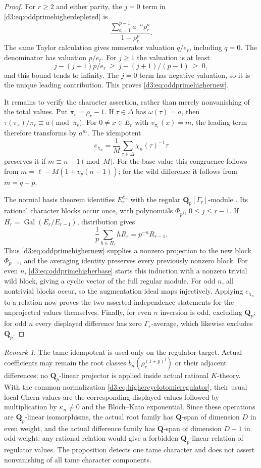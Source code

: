 \documentclass[11pt,a4paper]{amsart}
\numberwithin{equation}{section}
\theoremstyle{definition}
\theoremstyle{remark}
\newtheorem{remark}[theorem]{Remark}
\newcommand{\Q}{\mathbf Q}
\newcommand{\Gal}{\operatorname{Gal}}
\begin{document}
\begin{proof}
For $r\geq2$ and either parity, the $j=0$ term in
\eqref{d3:eq:oddprimehigherdepleted} is
\[
 \frac{\sum_{a=1}^{p-1}a^{-n}\rho_r^a}{1-\rho_r^p}.
\]
The same Taylor calculation gives numerator valuation $q/e_r$,
including $q=0$. The denominator has valuation $p/e_r$.
For $j\geq1$ the valuation is at least
\[
 j-(j+1)p/e_r\ \geq\ j-(j+1)/(p-1)\ \geq\ 0,
\]
and this bound tends to infinity. The $j=0$ term has negative
valuation, so it is the unique leading contribution. This proves
\eqref{d3:eq:oddprimehighernew}.

It remains to verify the character assertion, rather than merely
nonvanishing of the total values. Put $\pi_r=\rho_r-1$.
If $\tau\in\Delta$ has $\overline{\omega(\tau)}=a$, then
$\tau(\pi_r)/\pi_r\equiv a\pmod{\pi_r}$.
For $0\ne x\in E_r$ with $v_{\pi_r}(x)=m$, the leading term
therefore transforms by $a^m$. The idempotent
\[
 e_{\chi_n}=\frac1M\sum_{\tau\in\Delta}\chi_n(\tau)^{-1}\tau
\]
preserves it if $m\equiv n-1\pmod M$.
For the base value this congruence follows from
$m=\ell-M(1+v_p(n-1))$; for the wild difference it follows
from $m=q-p$.

The normal basis theorem identifies $E_r^{\chi_n}$ with the
regular $\Q_p[\Gamma_r]$-module
\cite[Chapter~I, p.~34]{MilneDuality}. Its rational character blocks
occur once, with polynomials $\Phi_{p^j}$, $0\leq j\leq r-1$.
If $H_r=\Gal(E_r/E_{r-1})$, distribution gives
\[
 \frac1p\sum_{h\in H_r}hR_r=p^{-n}R_{r-1}.
\]
Thus \eqref{d3:eq:oddprimehighernew} supplies a nonzero projection
to the new block $\Phi_{p^{r-1}}$, and the averaging identity
preserves every previously nonzero block.
For even $n$, \eqref{d3:eq:oddprimehigherbase} starts this induction
with a nonzero trivial wild block, giving a cyclic vector of
the full regular module. For odd $n$, all nontrivial blocks
occur, so the augmentation ideal maps injectively.
Applying $e_{\chi_n}$ to a relation now proves the two asserted
independence statements for the unprojected values themselves.
Finally, for even $n$ inversion is odd, excluding $\Q_p$;
for odd $n$ every displayed difference has zero $\Gamma_r$-average,
which likewise excludes $\Q_p$.
\end{proof}

\begin{remark}
The tame idempotent is used only on the regulator target.
Actual coefficients may remain the root classes
$b_n(\rho_r^{(1+p)^j})$ or their adjacent differences; no
$\Q_p$-linear projector is applied inside actual rational
$K$-theory. With the common normalization
\eqref{d3:eq:highercyclotomicregulator}, their usual local Chern
values are the corresponding displayed values followed by
multiplication by $\kappa_n\ne0$ and the Bloch--Kato exponential.
Since these operations are $\Q_p$-linear isomorphisms, the
actual root family has $\Q$-span of dimension $D$ in even
weight, and the actual difference family has $\Q$-span of
dimension $D-1$ in odd weight: any rational relation would
give a forbidden $\Q_p$-linear relation of regulator values.
The proposition detects one tame character and
does not assert nonvanishing of all tame character components.
\end{remark}
\end{document}
